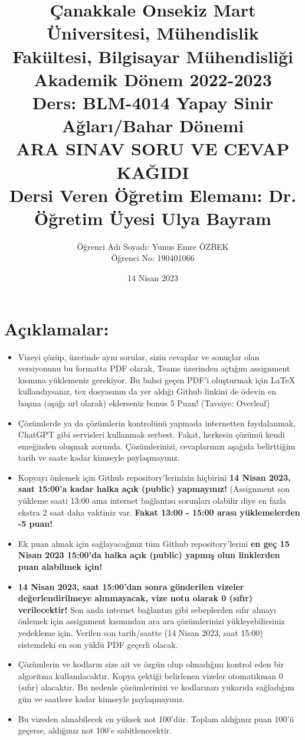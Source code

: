 \documentclass[11pt]{article}
\title{Çanakkale Onsekiz Mart Üniversitesi, Mühendislik Fakültesi, Bilgisayar Mühendisliği Akademik Dönem 2022-2023\\
Ders: BLM-4014 Yapay Sinir Ağları/Bahar Dönemi\\ 
ARA SINAV SORU VE CEVAP KAĞIDI\\
Dersi Veren Öğretim Elemanı: Dr. Öğretim Üyesi Ulya Bayram}
\author{%
\begin{minipage}{\textwidth}
\raggedright
Öğrenci Adı Soyadı: Yunus Emre ÖZBEK\\ %
Öğrenci No: 190401066
\end{minipage}%
}
\date{14 Nisan 2023}
\begin{document}
\maketitle

\vspace{-.5in}
\section*{Açıklamalar:}
\begin{itemize}
    \item Vizeyi çözüp, üzerinde aynı sorular, sizin cevaplar ve sonuçlar olan versiyonunu bu formatta PDF olarak, Teams üzerinden açtığım assignment kısmına yüklemeniz gerekiyor. Bu bahsi geçen PDF'i oluşturmak için LaTeX kullandıysanız, tex dosyasının da yer aldığı Github linkini de ödevin en başına (aşağı url olarak) eklerseniz bonus 5 Puan! (Tavsiye: Overleaf)
    \item Çözümlerde ya da çözümlerin kontrolünü yapmada internetten faydalanmak, ChatGPT gibi servisleri kullanmak serbest. Fakat, herkesin çözümü kendi emeğinden oluşmak zorunda. Çözümlerinizi, cevaplarınızı aşağıda belirttiğim tarih ve saate kadar kimseyle paylaşmayınız. 
    \item Kopyayı önlemek için Github repository'lerinizin hiçbirini \textbf{14 Nisan 2023, saat 15:00'a kadar halka açık (public) yapmayınız!} (Assignment son yükleme saati 13:00 ama internet bağlantısı sorunları olabilir diye en fazla ekstra 2 saat daha vaktiniz var. \textbf{Fakat 13:00 - 15:00 arası yüklemelerden -5 puan!}
    \item Ek puan almak için sağlayacağınız tüm Github repository'lerini \textbf{en geç 15 Nisan 2023 15:00'da halka açık (public) yapmış olun linklerden puan alabilmek için!}
    \item \textbf{14 Nisan 2023, saat 15:00'dan sonra gönderilen vizeler değerlendirilmeye alınmayacak, vize notu olarak 0 (sıfır) verilecektir!} Son anda internet bağlantısı gibi sebeplerden sıfır almayı önlemek için assignment kısmından ara ara çözümlerinizi yükleyebilirsiniz yedekleme için. Verilen son tarih/saatte (14 Nisan 2023, saat 15:00) sistemdeki en son yüklü PDF geçerli olacak.
    \item Çözümlerin ve kodların size ait ve özgün olup olmadığını kontrol eden bir algoritma kullanılacaktır. Kopya çektiği belirlenen vizeler otomatikman 0 (sıfır) alacaktır. Bu nedenle çözümlerinizi ve kodlarınızı yukarıda sağladığım gün ve saatlere kadar kimseyle paylaşmayınız.
    \item Bu vizeden alınabilecek en yüksek not 100'dür. Toplam aldığınız puan 100'ü geçerse, aldığınız not 100'e sabitlenecektir.

\end{itemize}
\end{document}
